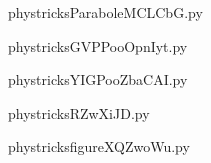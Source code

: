     

    \clearpage
    


    \newcommand{\CaptionFigParaboleMCLCbG}{<+Type your caption here+>}
    \begin{center}
        
    \end{center}
    phystricksParaboleMCLCbG.py

    

    \clearpage
    


    \newcommand{\CaptionFigGVPPooOpnIyt}{<+Type your caption here+>}
    \begin{center}
        
    \end{center}
    phystricksGVPPooOpnIyt.py

    

    \clearpage
    


    \newcommand{\CaptionFigYIGPooZbaCAI}{<+Type your caption here+>}
    \begin{center}
        
    \end{center}
    phystricksYIGPooZbaCAI.py

    

    \clearpage
    


    \newcommand{\CaptionFigRZwXiJD}{<+Type your caption here+>}
    \begin{center}
        
    \end{center}
    phystricksRZwXiJD.py

    

    \clearpage
    


    \newcommand{\CaptionFigfigureXQZwoWu}{<+Type your caption here+>}
    \begin{center}
        
    \end{center}
    phystricksfigureXQZwoWu.py

    

    \clearpage
    


